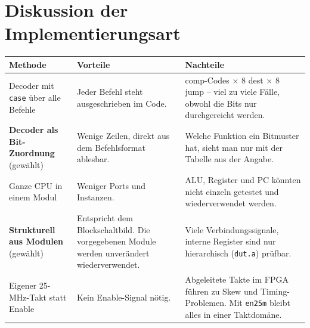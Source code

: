 \documentclass[11pt,a4paper]{article}
\begin{document}
\section{Diskussion der Implementierungsart}
\begin{tabular}{>{\raggedright}p{3.4cm}>{\raggedright}p{5.8cm}>{\raggedright\arraybackslash}p{5.8cm}}
\toprule
Methode & Vorteile & Nachteile \\ \midrule
Decoder mit \texttt{case} über alle Befehle &
Jeder Befehl steht ausgeschrieben im Code. &
28 comp-Codes $\times$ 8 dest $\times$ 8 jump -- viel zu viele Fälle, obwohl die Bits nur
durchgereicht werden. \\[2mm]
\textbf{Decoder als Bit-Zuordnung} (gewählt) &
Wenige Zeilen, direkt aus dem Befehlsformat ablesbar. &
Welche Funktion ein Bitmuster hat, sieht man nur mit der Tabelle aus der Angabe. \\[2mm]
Ganze CPU in einem Modul &
Weniger Ports und Instanzen. &
ALU, Register und PC könnten nicht einzeln getestet und wiederverwendet werden. \\[2mm]
\textbf{Strukturell aus Modulen} (gewählt) &
Entspricht dem Blockschaltbild. Die vorgegebenen Module werden unverändert
wiederverwendet. &
Viele Verbindungssignale, interne Register sind nur hierarchisch (\texttt{dut.a}) prüfbar. \\[2mm]
Eigener 25-MHz-Takt statt Enable &
Kein Enable-Signal nötig. &
Abgeleitete Takte im FPGA führen zu Skew und Timing-Problemen. Mit \texttt{en25m} bleibt alles
in einer Taktdomäne. \\
\bottomrule
\end{tabular}
\end{document}
